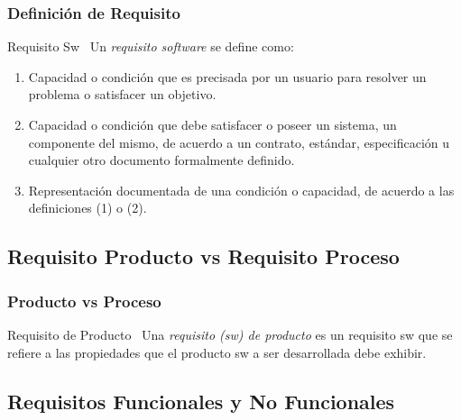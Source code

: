 \documentclass[a4paper,slidestop,xcolor=pst,dvips,blue]{beamer}
\begin{document}
\begin{frame}
    \frametitle{Definición de Requisito}
    \begin{block}{Requisito Sw~\cite{ieee:seGlossary}}
        Un \alert{\emph{requisito software}} se define como:
        \begin{enumerate}
            \item<2-> Capacidad o condición que es precisada por un usuario para resolver un problema o satisfacer un objetivo.
            \item<3-> Capacidad o condición que debe satisfacer o poseer un sistema, un componente del mismo, de acuerdo a un contrato, estándar, especificación u cualquier otro documento formalmente definido.
            \item<4-> Representación documentada de una condición o capacidad, de acuerdo a las definiciones (1) o (2).
        \end{enumerate}
    \end{block}
\end{frame}

\subsection{Requisito Producto vs Requisito Proceso}

\begin{frame}
    \frametitle{Producto vs Proceso}
    \begin{block}{Requisito de Producto~\cite{ieee:swebok}}
            Una \alert{\emph{requisito (sw) de producto}} es un requisito sw que se refiere a las propiedades que el producto sw a ser desarrollada debe exhibir.
    \end{block}
\end{frame}

\subsection{Requisitos Funcionales y No Funcionales}
\end{document}
